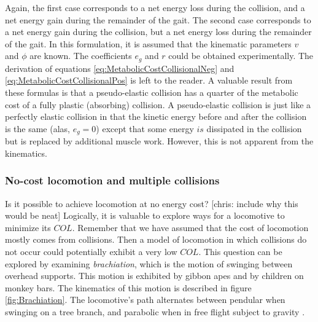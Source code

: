Again, the first case corresponds to a net energy loss during the collision, and a net energy gain during the remainder of the gait. The second case corresponds to a net energy gain during the collision, but a net energy loss during the remainder of the gait. In this formulation, it is assumed that the kinematic parameters $v$ and $\phi$ are known. The coefficients $e_{g}$ and $r$ could be obtained experimentally. The derivation of equations \ref{eq:MetabolicCostCollisionalNeg} and \ref{eq:MetabolicCostCollisionalPos} is left to the reader. A valuable result from these formulas is that a pseudo-elastic  collision has a quarter of the metabolic cost of a fully plastic (absorbing) collision. A pseudo-elastic collision is just like a perfectly elastic collision in that the kinetic energy before and after the collision is the same (alas, $e_{g} = 0$) except that some energy $is$ dissipated in the collision but is replaced by additional muscle work. However, this is not apparent from the kinematics.

\subsubsection*{No-cost locomotion and multiple collisions}

Is it possible to achieve locomotion at no energy cost? [chris: include why this would be neat] Logically, it is valuable to explore ways for a locomotive to minimize its $COL$. Remember that we have assumed that the cost of locomotion mostly comes from collisions. Then a model of locomotion in which collisions do not occur could potentially exhibit a very low $COL$. This question can be explored by examining \textit{brachiation}, which is the motion of swinging between overhead supports. This motion is exhibited by gibbon apes and by children on monkey bars. The kinematics of this motion is described in figure \ref{fig:Brachiation}. The locomotive's path alternates between pendular when swinging on a tree branch, and parabolic when in free flight subject to gravity \cite{bertram99}.

